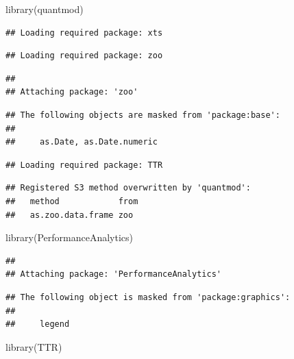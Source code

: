 \documentclass[]{tufte-handout}
\newenvironment{Shaded}{}{}
\newcommand{\FunctionTok}[1]{\textcolor[rgb]{0.02,0.16,0.49}{#1}}
\newcommand{\NormalTok}[1]{#1}
\begin{document}
\begin{Shaded}
\begin{Highlighting}[]
\FunctionTok{library}\NormalTok{(quantmod)}
\end{Highlighting}
\end{Shaded}

\begin{verbatim}
## Loading required package: xts
\end{verbatim}

\begin{verbatim}
## Loading required package: zoo
\end{verbatim}

\begin{verbatim}
## 
## Attaching package: 'zoo'
\end{verbatim}

\begin{verbatim}
## The following objects are masked from 'package:base':
## 
##     as.Date, as.Date.numeric
\end{verbatim}

\begin{verbatim}
## Loading required package: TTR
\end{verbatim}

\begin{verbatim}
## Registered S3 method overwritten by 'quantmod':
##   method            from
##   as.zoo.data.frame zoo
\end{verbatim}

\begin{Shaded}
\begin{Highlighting}[]
\FunctionTok{library}\NormalTok{(PerformanceAnalytics)}
\end{Highlighting}
\end{Shaded}

\begin{verbatim}
## 
## Attaching package: 'PerformanceAnalytics'
\end{verbatim}

\begin{verbatim}
## The following object is masked from 'package:graphics':
## 
##     legend
\end{verbatim}

\begin{Shaded}
\begin{Highlighting}[]
\FunctionTok{library}\NormalTok{(TTR)}
\end{Highlighting}
\end{Shaded}
\end{document}

